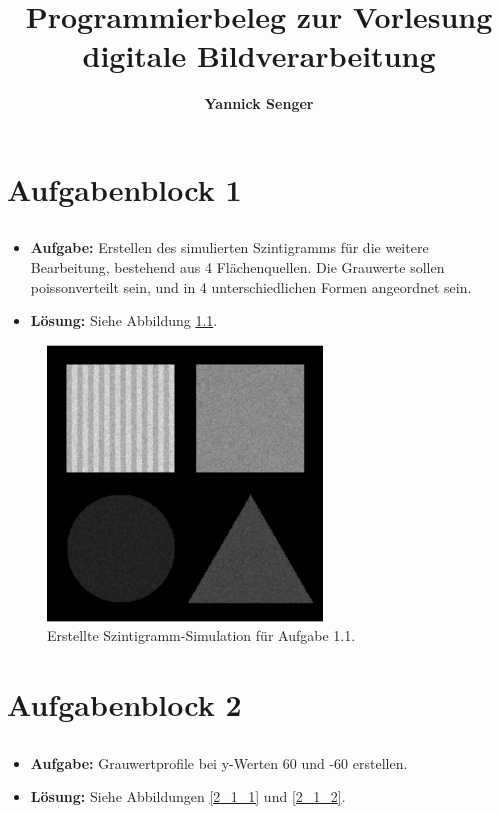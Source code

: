 \documentclass[12pt, a4paper, twoside]{report}
\title{Programmierbeleg zur Vorlesung digitale Bildverarbeitung}
\author {\textbf{Yannick Senger}}
\begin{document}
\maketitle
\newpage
\tableofcontents
\newpage
\chapter{Aufgabenblock 1}
\section{}

\begin{itemize}
\item \textbf{Aufgabe:} Erstellen des simulierten Szintigramms für die weitere Bearbeitung, bestehend aus 4 Fl\"achenquellen. Die Grauwerte sollen poissonverteilt sein, und in 4 unterschiedlichen Formen angeordnet sein.

\item \textbf{L\"osung:} Siehe Abbildung \ref{1_1}.
\end{itemize}

\begin{figure}[h]
\centering
\includegraphics[width=0.65\textwidth]{../bilder/1_1.png}
\caption{Erstellte Szintigramm-Simulation für Aufgabe 1.1.}
\label{1_1}
\end{figure}

\chapter{Aufgabenblock 2}
\section{}
\begin{itemize}
\item \textbf{Aufgabe:} Grauwertprofile bei y-Werten 60 und -60 erstellen.
\item \textbf{Lösung:} Siehe Abbildungen \ref{2_1_1} und \ref{2_1_2}.
\end{itemize}
\end{document}

